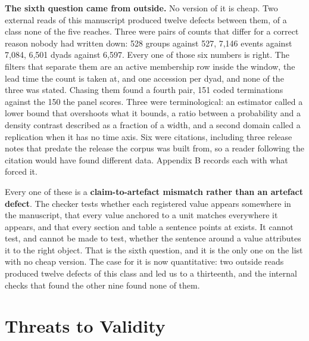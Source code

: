 \documentclass[twoside,11pt]{article}
\begin{document}
\textbf{The sixth question came from outside.} No version of it is cheap. Two external reads of this manuscript produced twelve defects between them, of a class none of the five reaches. Three were pairs of counts that differ for a correct reason nobody had written down: 528 groups against 527, 7,146 events against 7,084, 6,501 dyads against 6,597. Every one of those six numbers is right. The filters that separate them are an active membership row inside the window, the lead time the count is taken at, and one accession per dyad, and none of the three was stated. Chasing them found a fourth pair, 151 coded terminations against the 150 the panel scores. Three were terminological: an estimator called a lower bound that overshoots what it bounds, a ratio between a probability and a density contrast described as a fraction of a width, and a second domain called a replication when it has no time axis. Six were citations, including three release notes that predate the release the corpus was built from, so a reader following the citation would have found different data. Appendix B records each with what forced it.

Every one of these is a \textbf{claim-to-artefact mismatch rather than an artefact defect}. The checker tests whether each registered value appears somewhere in the manuscript, that every value anchored to a unit matches everywhere it appears, and that every section and table a sentence points at exists. It cannot test, and cannot be made to test, whether the sentence around a value attributes it to the right object. That is the sixth question, and it is the only one on the list with no cheap version. The case for it is now quantitative: two outside reads produced twelve defects of this class and led us to a thirteenth, and the internal checks that found the other nine found none of them.

\section{Threats to Validity}
\end{document}
